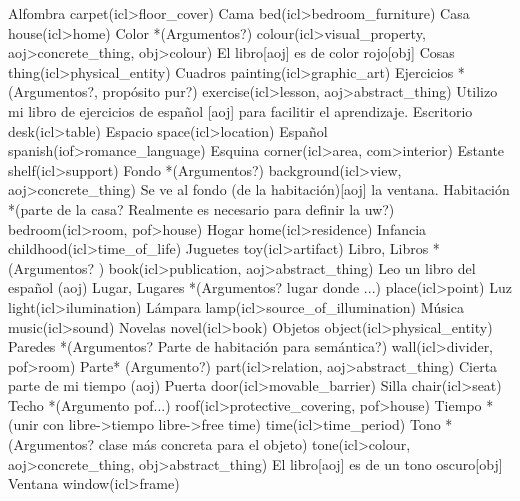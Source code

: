 \documentclass{article}
\begin{document}
{
    \uw
    {Alfombra}
    {carpet(icl>floor\_cover)}
    {}
    \uw
    {Cama}
    {bed(icl>bedroom\_furniture)}
    {}
    \uw
    {Casa}
    {house(icl>home)}
    {}
    \uw
    {Color *(Argumentos?)}
    {colour(icl>visual\_property, aoj>concrete\_thing, obj>colour)}
    {El libro[aoj] es de color rojo[obj]}
    \uw
    {Cosas}
    {thing(icl>physical\_entity)}
    {}
    \uw
    {Cuadros}
    {painting(icl>graphic\_art)}
    {}
    \uw
    {Ejercicios *(Argumentos?, propósito pur?)}
    {exercise(icl>lesson, aoj>abstract\_thing)}
    {Utilizo mi libro de ejercicios de español [aoj] para facilitir el aprendizaje.}
    \uw
    {Escritorio}
    {desk(icl>table)}
    {}
    \uw
    {Espacio}
    {space(icl>location)}
    {}
    \uw
    {Español}
    {spanish(iof>romance\_language)}
    {}
    \uw
    {Esquina}
    {corner(icl>area, com>interior)}
    {}
    \uw
    {Estante}
    {shelf(icl>support)}
    {}
    \uw
    {Fondo *(Argumentos?)}
    {background(icl>view, aoj>concrete\_thing)}
    {Se ve al fondo (de la habitación)[aoj] la ventana.}
    \uw
    {Habitación *(parte de la casa? Realmente es necesario para definir la uw?)}
    {bedroom(icl>room, pof>house)}
    {}
    \uw
    {Hogar}
    {home(icl>residence)}
    {}
    \uw
    {Infancia}
    {childhood(icl>time\_of\_life)}
    {}
    \uw
    {Juguetes}
    {toy(icl>artifact)}
    {}
    \uw
    {Libro, Libros *(Argumentos? )}
    {book(icl>publication, aoj>abstract\_thing)}
    {Leo un libro del español (aoj)}
    \uw
    {Lugar, Lugares *(Argumentos? lugar donde ...)}
    {place(icl>point)}
    {}
    \uw
    {Luz}
    {light(icl>ilumination)}
    {}
    \uw
    {Lámpara}
    {lamp(icl>source\_of\_illumination)}
    {}
    \uw
    {Música}
    {music(icl>sound)}
    {}
    \uw
    {Novelas}
    {novel(icl>book)}
    {}
    \uw
    {Objetos}
    {object(icl>physical\_entity)}
    {}
    \uw
    {Paredes *(Argumentos? Parte de habitación para semántica?)}
    {wall(icl>divider, pof>room)}
    {}
    \uw
    {Parte* (Argumento?)}
    {part(icl>relation, aoj>abstract\_thing)}
    {Cierta parte de mi tiempo (aoj)}
    \uw
    {Puerta}
    {door(icl>movable\_barrier)}
    {}
    \uw
    {Silla}
    {chair(icl>seat)}
    {}
    \uw
    {Techo *(Argumento pof...)}
    {roof(icl>protective\_covering, pof>house)}
    {}
    \uw
    {Tiempo *(unir con libre->tiempo libre->free time)}
    {time(icl>time\_period)}
    {}
    \uw
    {Tono *(Argumentos? clase más concreta para el objeto)}
    {tone(icl>colour, aoj>concrete\_thing, obj>abstract\_thing)}
    {El libro[aoj] es de un tono oscuro[obj] }
    \uw
    {Ventana}
    {window(icl>frame)}
    {}
}
\end{document}
